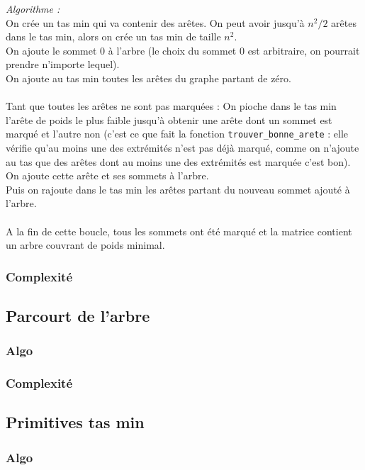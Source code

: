 \documentclass[a4paper,11pt]{article}
\begin{document}
\textit{Algorithme : } \\
On crée un tas min qui va contenir des arêtes. On peut avoir jusqu'à $n^2/2$ arêtes dans le tas min, alors on crée un tas min de taille $n^2$.\\
On ajoute le sommet 0 à l'arbre (le choix du sommet 0 est arbitraire, on pourrait prendre n'importe lequel).\\
On ajoute au tas min toutes les arêtes du graphe partant de zéro.\\
\\
Tant que toutes les arêtes ne sont pas marquées : 
On pioche dans le tas min l'arête de poids le plus faible jusqu'à obtenir une arête dont un sommet est marqué et l'autre non (c'est ce que fait la fonction \texttt{trouver\_bonne\_arete} : elle vérifie qu'au moins une des extrémités n'est pas déjà marqué, comme on n'ajoute au tas que des arêtes dont au moins une des extrémités est marquée c'est bon).\\
On ajoute cette arête et ses sommets à l'arbre.\\
Puis on rajoute dans le tas min les arêtes partant du nouveau sommet ajouté à l'arbre.\\
\\
A la fin de cette boucle, tous les sommets ont été marqué et la matrice contient un arbre couvrant de poids minimal.\\

\subsubsection*{Complexité}

\subsection{Parcourt de l'arbre} %
\subsubsection*{Algo}
\subsubsection*{Complexité}

\subsection{Primitives tas min} %
\subsubsection*{Algo}
\end{document}
